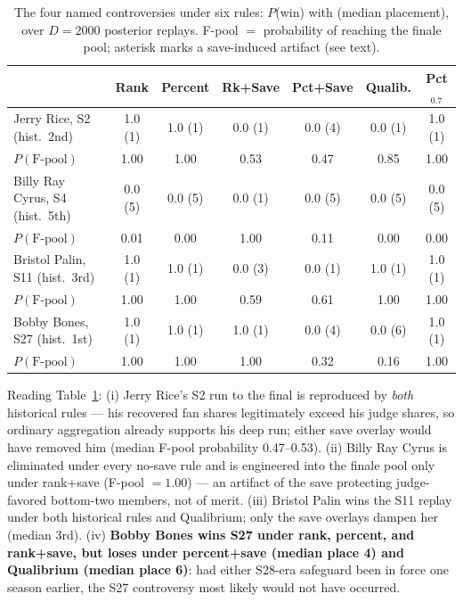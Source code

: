 \begin{table}[H]
\centering
\caption{The four named controversies under six rules: $P$(win) with (median
placement), over $D=2000$ posterior replays. F-pool $=$ probability of reaching
the finale pool; asterisk marks a save-induced artifact (see text).}
\label{tab:controversies}
\small
\begin{tabular}{lcccccc}
\toprule
 & Rank & Percent & Rk+Save & Pct+Save & Qualib. & Pct$_{0.7}$ \\
\midrule
Jerry Rice, S2 (hist.\ 2nd) & 1.0 (1) & 1.0 (1) & 0.0 (1) & 0.0 (4) & 0.0 (1) & 1.0 (1) \\
\quad $P(\text{F-pool})$ & 1.00 & 1.00 & 0.53 & 0.47 & 0.85 & 1.00 \\
\addlinespace
Billy Ray Cyrus, S4 (hist.\ 5th) & 0.0 (5) & 0.0 (5) & 0.0 (1) & 0.0 (5) & 0.0 (5) & 0.0 (5) \\
\quad $P(\text{F-pool})$ & 0.01 & 0.00 & 1.00 & 0.11 & 0.00 & 0.00 \\
\addlinespace
Bristol Palin, S11 (hist.\ 3rd) & 1.0 (1) & 1.0 (1) & 0.0 (3) & 0.0 (1) & 1.0 (1) & 1.0 (1) \\
\quad $P(\text{F-pool})$ & 1.00 & 1.00 & 0.59 & 0.61 & 1.00 & 1.00 \\
\addlinespace
Bobby Bones, S27 (hist.\ 1st) & 1.0 (1) & 1.0 (1) & 1.0 (1) & 0.0 (4) & 0.0 (6) & 1.0 (1) \\
\quad $P(\text{F-pool})$ & 1.00 & 1.00 & 1.00 & 0.32 & 0.16 & 1.00 \\
\bottomrule
\end{tabular}
\end{table}

Reading Table~\ref{tab:controversies}: (i) Jerry Rice's S2 run to the final is
reproduced by \emph{both} historical rules --- his recovered fan shares
legitimately exceed his judge shares, so ordinary aggregation already supports his
deep run; either save overlay would have removed him (median F-pool probability
0.47--0.53). (ii) Billy Ray Cyrus is eliminated under every no-save rule and is
engineered into the finale pool only under rank+save (F-pool $= 1.00$) --- an
artifact of the save protecting judge-favored bottom-two members, not of merit.
(iii) Bristol Palin wins the S11 replay under both historical rules and Qualibrium;
only the save overlays dampen her (median 3rd). (iv) \textbf{Bobby Bones wins S27
under rank, percent, and rank+save, but loses under percent+save (median place 4)
and Qualibrium (median place 6)}: had either S28-era safeguard been in force one
season earlier, the S27 controversy most likely would not have occurred.

